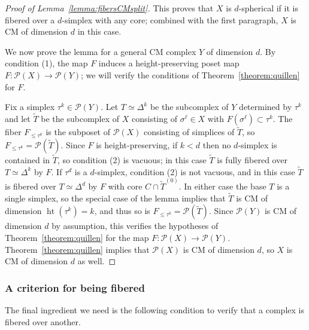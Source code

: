 \documentclass[11 pt]{article}
\theoremstyle{plain}
\theoremstyle{definition}
\numberwithin{equation}{section}
\newcommand\Ttop{\widetilde{T}}
\newcommand\Poset{\ensuremath{\mathcal{P}}}
\DeclareMathOperator{\height}{ht}
\begin{document}
\begin{proof}[Proof of Lemma~\ref{lemma:fibersCMsplit}]
This proves that $X$ is $d$-spherical if it is fibered over a $d$-simplex with any core; combined with the first paragraph, $X$ is CM of dimension $d$ in this case.

We now prove the lemma for a general CM complex $Y$ of dimension $d$.  By condition (1), the map $F$ induces a height-preserving poset map $F\colon \Poset(X)\to \Poset(Y)$; we will verify the conditions of Theorem~\ref{theorem:quillen} for $F$.

Fix a simplex $\tau^k\in \Poset(Y)$. Let $T\simeq \Delta^k$ be the subcomplex of $Y$ determined by $\tau^k$ and let $\Ttop$ be the subcomplex of $X$ consisting of $\sigma^\ell\in X$ with $F(\sigma^\ell)\subset \tau^k$.  
The fiber $F_{\leq \tau^k}$ is the subposet of $\Poset(X)$ consisting of simplices of $\Ttop$, so $F_{\leq\tau^k}=\Poset(\Ttop)$. Since $F$ is height-preserving, if $k<d$ then no $d$-simplex is contained in $\Ttop$, so condition (2) is vacuous; in this case $\Ttop$ is fully fibered over $T\simeq \Delta^k$ by $F$. If $\tau^d$ is a $d$-simplex,  condition (2) is not vacuous, and in this case $\Ttop$ is fibered over $T\simeq\Delta^d$ by $F$ with core $C\cap \Ttop^{(0)}$. In either case the base $T$ is a single simplex, so the special case of the lemma implies that $\Ttop$ is CM of dimension $\height(\tau^k)=k$, and thus so is $F_{\leq\tau^k}=\Poset(\Ttop)$.
Since $\Poset(Y)$ is CM of dimension $d$ by assumption, this verifies the hypotheses of Theorem~\ref{theorem:quillen} for the map $F\colon \Poset(X)\to \Poset(Y)$. Theorem~\ref{theorem:quillen} implies that $\Poset(X)$ is CM of dimension $d$, so $X$ is CM of dimension $d$ as well.
\end{proof}

\subsubsection{A criterion for being fibered}
The final ingredient we need is the following condition to verify that a complex is fibered over another.
\end{document}
